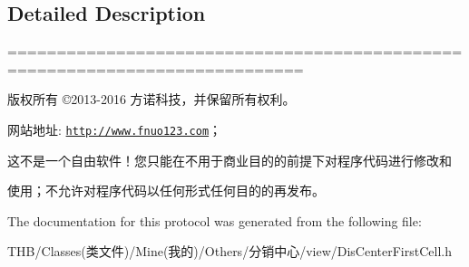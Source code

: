 \subsection{Detailed Description}
============================================================================

版权所有 ©2013-\/2016 方诺科技，并保留所有权利。

网站地址\+: \href{http://www.fnuo123.com}{\tt http\+://www.\+fnuo123.\+com}； 



这不是一个自由软件！您只能在不用于商业目的的前提下对程序代码进行修改和

使用；不允许对程序代码以任何形式任何目的的再发布。 

 

The documentation for this protocol was generated from the following file\+:\begin{DoxyCompactItemize}
\item 
T\+H\+B/\+Classes(类文件)/\+Mine(我的)/\+Others/分销中心/view/Dis\+Center\+First\+Cell.\+h\end{DoxyCompactItemize}
